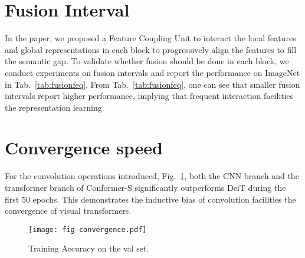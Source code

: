 \documentclass[10pt,twocolumn,letterpaper]{article}
\begin{document}
\section{Fusion Interval}
In the paper, we proposed a Feature Coupling Unit to interact the local features and global representations in each block to progressively align the features to fill the semantic gap.
To validate whether fusion should be done in each block, we conduct experiments on fusion intervals and report the performance on ImageNet in Tab.~\ref{tab:fusionfeq}.
From Tab.~\ref{tab:fusionfeq}, one can see that 
smaller fusion intervals report higher performance, implying that frequent interaction facilities the representation learning.


\begin{table}[h]
    \centering
    \caption{Comparison of fusion intervals. 1, 2 and 4 respectively represent performing fusion every 1, 2 and 4 block(s).}
    \label{tab:fusionfeq}
\end{table}




\section{Convergence speed}

For the convolution operations introduced, Fig.~\ref{fig:convergence}, both the CNN branch and the transformer branch of Conformer-S significantly outperforms DeiT during the first 50 epochs. 
This demonstrates the inductive bias of convolution facilities the convergence of visual transformers.

\begin{figure}[!h]
\begin{center}
\texttt{[image: fig-convergence.pdf]}
\end{center}
\vspace{-1em}
\caption{Training Accuracy on the  val set.}
\label{fig:convergence}
\end{figure}
\end{document}
